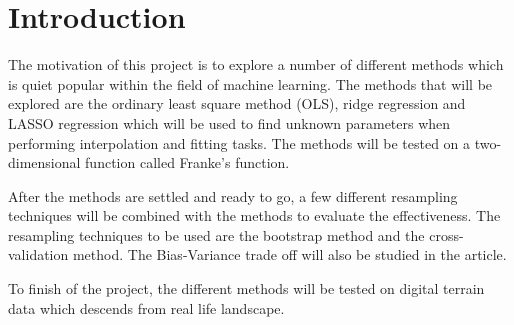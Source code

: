 \documentclass[../main.tex]{subfiles}
\begin{document}
\section{Introduction}\label{sec:introduction}
The motivation of this project is to explore a number of different methods which is quiet popular within the field of machine learning. The methods that will be explored are the ordinary least square method (OLS), ridge regression and LASSO regression which will be used to find unknown parameters when performing interpolation and fitting tasks. The methods will be tested on a two-dimensional function called Franke’s function.

After the methods are settled and ready to go, a few different resampling techniques will be combined with the methods to evaluate the effectiveness. The resampling techniques to be used are the bootstrap method and the cross-validation method. The Bias-Variance trade off will also be studied in the article.

To finish of the project, the different methods will be tested on digital terrain data which descends from real life landscape.
\end{document}
